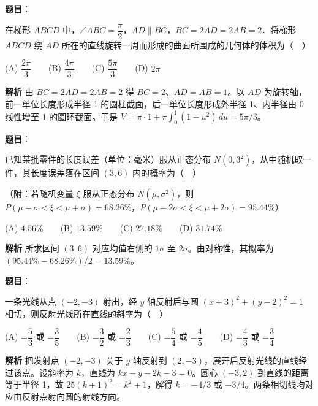 \begin{answer}

\textbf{题目}：

在梯形 $ABCD$ 中，$\angle ABC=\dfrac{\pi}{2}$，$AD\parallel BC$，$BC=2AD=2AB=2$．将梯形 $ABCD$ 绕 $AD$ 所在的直线旋转一周而形成的曲面所围成的几何体的体积为（　）

(A) $\dfrac{2\pi}{3}$　　(B) $\dfrac{4\pi}{3}$　　(C) $\dfrac{5\pi}{3}$　　(D) $2\pi$

\textbf{解析}
由 $BC=2AD=2AB=2$ 得 $BC=2$、$AD=AB=1$。以 $AD$ 为旋转轴，前一单位长度形成半径 1 的圆柱截面，后一单位长度形成外半径 1、内半径由 0 线性增至 1 的圆环截面。于是 $V=\pi\cdot1+\pi\int_0^1(1-u^2)\,du=5\pi/3$。


\end{answer}
\begin{answer}

\textbf{题目}：

已知某批零件的长度误差（单位：毫米）服从正态分布 $N(0,3^2)$，从中随机取一件，其长度误差落在区间 $(3,6)$ 内的概率为（　）

（附：若随机变量 $\xi$ 服从正态分布 $N(\mu,\sigma^2)$，则 $P(\mu-\sigma<\xi<\mu+\sigma)=68.26\%$，$P(\mu-2\sigma<\xi<\mu+2\sigma)=95.44\%$）

(A) $4.56\%$　　(B) $13.59\%$　　(C) $27.18\%$　　(D) $31.74\%$

\textbf{解析}
所求区间 $(3,6)$ 对应均值右侧的 $1\sigma$ 至 $2\sigma$。由对称性，其概率为 $(95.44\%-68.26\%)/2=13.59\%$。


\end{answer}
\begin{answer}

\textbf{题目}：

一条光线从点 $(-2,-3)$ 射出，经 $y$ 轴反射后与圆 $(x+3)^2+(y-2)^2=1$ 相切，则反射光线所在直线的斜率为（　）

(A) $-\dfrac{5}{3}$ 或 $-\dfrac{3}{5}$　　(B) $-\dfrac{3}{2}$ 或 $-\dfrac{2}{3}$　　(C) $-\dfrac{5}{4}$ 或 $-\dfrac{4}{5}$　　(D) $-\dfrac{4}{3}$ 或 $-\dfrac{3}{4}$

\textbf{解析}
把发射点 $(-2,-3)$ 关于 $y$ 轴反射到 $(2,-3)$，展开后反射光线的直线经过该点。设斜率为 $k$，直线为 $kx-y-2k-3=0$。圆心 $(-3,2)$ 到直线的距离等于半径 1，故 $25(k+1)^2=k^2+1$，解得 $k=-4/3$ 或 $-3/4$。两条相切线均对应由反射点射向圆的射线方向。


\end{answer}
